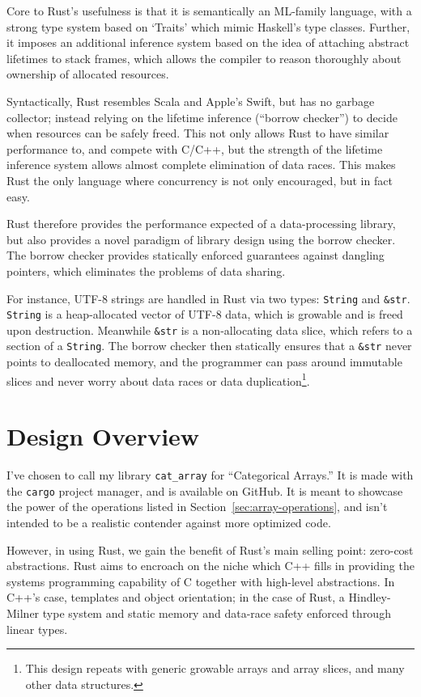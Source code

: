 \documentclass{DIKU-report-variant}
\begin{document}
Core to Rust's usefulness is that it is semantically an ML-family language, with a strong type
system based on `Traits' which mimic Haskell's type classes. Further, it imposes an additional
inference system based on the idea of attaching abstract lifetimes to stack frames, which allows
the compiler to reason thoroughly about ownership of allocated resources.

Syntactically, Rust resembles Scala and Apple's Swift, but has no garbage collector; instead relying
on the lifetime inference (``borrow checker'') to decide when resources can be safely freed. This not
only allows Rust to have similar performance to, and compete with C/C++, but the strength of the lifetime
inference system allows almost complete elimination of data races. This makes Rust the only language
where concurrency is not only encouraged, but in fact easy.

Rust therefore provides the performance expected of a data-processing library, but also
provides a novel paradigm of library design using the borrow checker. The borrow checker provides
statically enforced guarantees against dangling pointers, which eliminates the problems
of data sharing.

For instance, UTF-8 strings are handled in Rust via two types: \texttt{String} and \texttt{\&str}.
\texttt{String} is a heap-allocated vector of UTF-8 data, which is growable and is freed upon destruction.
Meanwhile \texttt{\&str} is a non-allocating data slice, which refers to a section of a \texttt{String}.
The borrow checker then statically ensures that a \texttt{\&str} never points to deallocated memory, and
the programmer can pass around immutable slices and never worry about data races or data duplication\footnote{
This design repeats with generic growable arrays and array slices, and many other data structures.}.

\section{Design Overview}

I've chosen to call my library \texttt{cat\_array} for ``Categorical Arrays.''  It is made with the
\texttt{cargo} project manager, and is available on GitHub.
It is meant to showcase the power of the operations listed in Section~\ref{sec:array-operations},
and isn't intended to be a realistic contender against more optimized code.

However, in using Rust, we gain the benefit of Rust's main selling point: zero-cost abstractions.
Rust aims to encroach on the niche which C++ fills in providing the systems programming capability
of C together with high-level abstractions. In C++'s case, templates and object orientation; in the
case of Rust, a Hindley-Milner type system and static memory and data-race safety enforced through
linear types.
\end{document}
